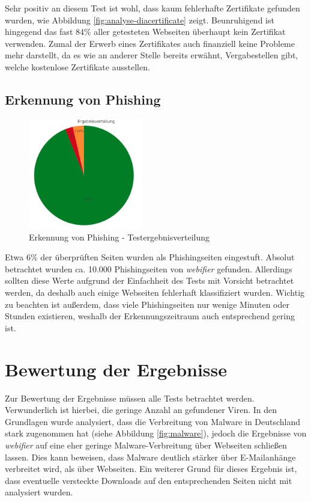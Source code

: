 Sehr positiv an diesem Test ist wohl, dass kaum fehlerhafte Zertifikate gefunden wurden, wie
Abbildung \ref{fig:analyse-diacertificate} zeigt. Beunruhigend ist hingegend das fast 84\% aller getesteten Webseiten überhaupt kein Zertifikat verwenden. Zumal der Erwerb eines Zertifikates auch finanziell keine Probleme mehr darstellt, da es wie an anderer Stelle bereits erwähnt, Vergabestellen gibt, welche kostenlose Zertifikate ausstellen.

\subsection{Erkennung von Phishing}
\begin{figure}[H]
  \centering
  \includegraphics[width=5cm]{images/stats/diaphishing}
  \caption{Erkennung von Phishing - Testergebnisverteilung}
  \label{fig:analyse-diaphishing}
\end{figure}

Etwa 6\% der überprüften Seiten wurden als Phishingseiten eingestuft. Absolut betrachtet wurden ca. 10.000 Phishingseiten von \textit{webifier} gefunden. Allerdings sollten diese Werte aufgrund der Einfachheit des Tests mit Vorsicht betrachtet werden, da deshalb auch einige Webseiten fehlerhaft klassifiziert wurden. Wichtig zu beachten ist außerdem, dass viele Phishingseiten nur wenige Minuten oder Stunden existieren, weshalb der Erkennungszeitraum auch entsprechend gering ist.

\section{Bewertung der Ergebnisse}
Zur Bewertung der Ergebnisse müssen alle Tests betrachtet werden. Verwunderlich ist hierbei, die geringe Anzahl an gefundener Viren. In den Grundlagen wurde analysiert, dass die Verbreitung von Malware in Deutschland stark zugenommen hat (siehe Abbildung \ref{fig:malware}), jedoch die Ergebnisse von \textit{webifier} auf eine eher geringe Malware-Verbreitung über Webseiten schließen lassen. Dies kann beweisen, dass Malware deutlich stärker über E-Mailanhänge verbreitet wird, als über Webseiten. Ein weiterer Grund für dieses Ergebnis ist, dass eventuelle versteckte Downloads auf den entsprechenden Seiten nicht mit analysiert wurden.

